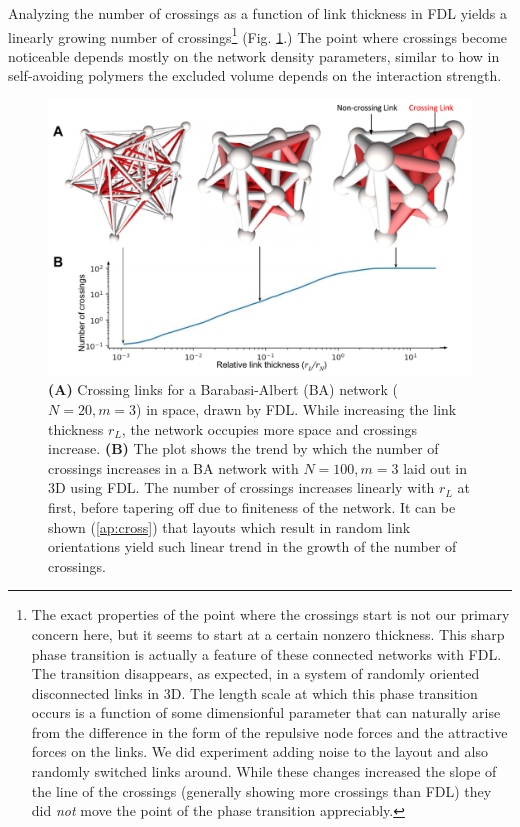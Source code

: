 \documentclass[nofootinbib,preprint,floatfix,titlepage,superscriptaddress]{revtex4} %
\begin{document}
Analyzing the number of crossings as a function of link thickness in FDL yields a linearly growing number of crossings\footnote{The exact properties of the point where the crossings start is not our primary concern here, but it seems to start at a certain nonzero thickness. 
This sharp phase transition is actually a feature of these connected networks with FDL. 
The transition disappears, as expected, in a system of randomly oriented disconnected links in 3D. 
The length scale at which this phase transition occurs is a function of some dimensionful parameter that can naturally arise from the difference in the form of the repulsive node forces and the attractive forces on the links. We did experiment adding noise to the layout and also randomly switched links around. While these changes increased the slope of the line of the crossings (generally showing more crossings than FDL) they did {\em not} move the point of the phase transition appreciably.}  (Fig. \ref{fig:crs}.) 
The point where crossings become noticeable depends mostly on the network density parameters, similar to how in self-avoiding polymers the excluded volume depends on the interaction strength. 
\begin{figure}
    \centering
    \includegraphics[width=.7\columnwidth]{fig-09-19/3D-cross.pdf}
    \caption{\scriptsize
    {\bf (A)}  Crossing links for a Barabasi-Albert (BA) network ($N = 20, m = 3$) in space, drawn by FDL. While increasing the link thickness $r_L$, the network occupies more space and crossings increase. 
    {\bf (B)} The plot shows the trend by which the number of crossings increases in a BA network with $N=100, m =3$ laid out in 3D using FDL.
    The number of crossings increases linearly with $r_L$ at first, before tapering off due to finiteness of the network. It can be shown (\ref{ap:cross}) that layouts which result in random link orientations yield such linear trend in the growth of the number of crossings.
    }     
    \label{fig:crs}
\end{figure}
\end{document}

